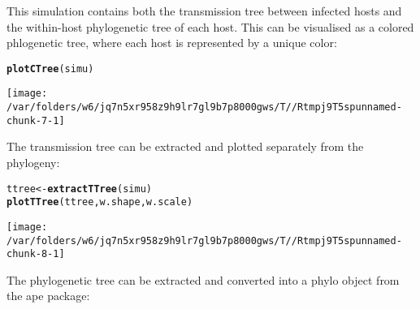 \documentclass[a4paper]{article}\usepackage[]{graphicx}\usepackage[]{color}
\makeatletter
\newcommand{\hlstd}[1]{\textcolor[rgb]{0.345,0.345,0.345}{#1}}%
\newcommand{\hlkwb}[1]{\textcolor[rgb]{0.69,0.353,0.396}{#1}}%
\newcommand{\hlkwd}[1]{\textcolor[rgb]{0.737,0.353,0.396}{\textbf{#1}}}%
\newenvironment{kframe}{%
 \def\at@end@of@kframe{}%
 \ifinner\ifhmode%
  \def\at@end@of@kframe{\end{minipage}}%
  \begin{minipage}{\columnwidth}%
 \fi\fi%
 \def\FrameCommand##1{\hskip\@totalleftmargin \hskip-\fboxsep
 \colorbox{shadecolor}{##1}\hskip-\fboxsep
     \hskip-\linewidth \hskip-\@totalleftmargin \hskip\columnwidth}%
 \MakeFramed {\advance\hsize-\width
   \@totalleftmargin\z@ \linewidth\hsize
   \@setminipage}}%
 {\par\unskip\endMakeFramed%
 \at@end@of@kframe}
\newenvironment{knitrout}{}{} %
\makeatother
\begin{document}
This simulation contains both the transmission tree between infected hosts and the within-host phylogenetic tree of each host. This can be visualised as a colored phlogenetic tree, where each host is represented by a unique color:

\begin{center}
\begin{knitrout}
\color{fgcolor}\begin{kframe}
\begin{alltt}
\hlkwd{plotCTree}\hlstd{(simu)}
\end{alltt}
\end{kframe}

{\centering \texttt{[image: /var/folders/w6/jq7n5xr958z9h9lr7gl9b7p8000gws/T//Rtmpj9T5spunnamed-chunk-7-1]} 

}



\end{knitrout}
\end{center}

The transmission tree can be extracted and plotted separately from the phylogeny:

\begin{knitrout}
\color{fgcolor}\begin{kframe}
\begin{alltt}
\hlstd{ttree}\hlkwb{<-}\hlkwd{extractTTree}\hlstd{(simu)}
\hlkwd{plotTTree}\hlstd{(ttree,w.shape,w.scale)}
\end{alltt}
\end{kframe}

{\centering \texttt{[image: /var/folders/w6/jq7n5xr958z9h9lr7gl9b7p8000gws/T//Rtmpj9T5spunnamed-chunk-8-1]} 

}



\end{knitrout}

The phylogenetic tree can be extracted and converted into a phylo object from the ape package:
\end{document}
